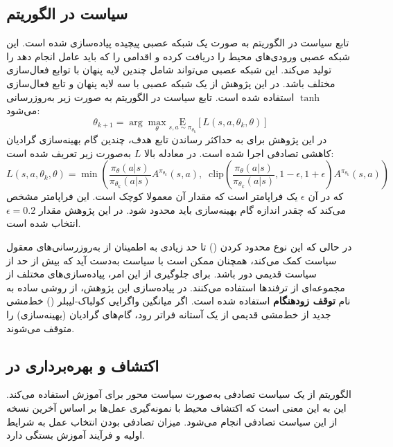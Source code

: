\subsection{
    سیاست در الگوریتم 
}
تابع سیاست در الگوریتم  به صورت یک شبکه عصبی پیچیده پیاده‌سازی شده است. این شبکه عصبی ورودی‌های محیط را دریافت کرده و اقدامی را که باید عامل انجام دهد را تولید می‌کند. این شبکه عصبی می‌تواند شامل چندین لایه پنهان با توابع فعال‌سازی مختلف باشد. در این پژوهش از یک شبکه عصبی با سه لایه پنهان و تابع فعال‌سازی 
\(\tanh\)
استفاده شده است.
تابع سیاست در الگوریتم  به صورت زیر به‌روز‌رسانی می‌شود:
\begin{equation}
    \theta_{k+1} = \arg \max_{\theta} \underset{s,a \sim \pi_{\theta_k}}{{\mathrm E}}\left[
        L(s,a,\theta_k, \theta)\right]
\end{equation}
در این پژوهش برای به حداکثر رساندن تابع هدف، چندین گام بهینه‌سازی 
گرادیان کاهشی تصادفی
اجرا شده است.
در معادله بالا
\(L\)
به‌صورت زیر تعریف شده است:
\begin{equation}
    L(s,a,\theta_k,\theta) = \min\left(
    \frac{\pi_{\theta}(a|s)}{\pi_{\theta_k}(a|s)}  A^{\pi_{\theta_k}}(s,a), \;\;
    \text{clip}\left(\frac{\pi_{\theta}(a|s)}{\pi_{\theta_k}(a|s)}, 1 - \epsilon, 1+\epsilon \right) A^{\pi_{\theta_k}}(s,a)
    \right)
\end{equation}
که در آن
\(\epsilon\)
یک فراپامتر است که مقدار آن معمولا کوچک است.
این فراپامتر مشخص می‌کند که چقدر اندازه گام بهینه‌سازی باید محدود شود.
در این پژوهش مقدار 
\(\epsilon = 0.2\)
انتخاب شده است.


در حالی که این نوع محدود کردن 
()
 تا حد زیادی به اطمینان از به‌روزرسانی‌های معقول سیاست کمک می‌کند، همچنان ممکن است با سیاست به‌دست آید که بیش از حد از سیاست قدیمی دور باشد. برای جلوگیری از این امر، پیاده‌سازی‌های مختلف  از مجموعه‌ای از ترفندها استفاده می‌کنند. در پیاده‌سازی این پژوهش، از روشی ساده به نام
  \textbf{توقف زودهنگام}
   استفاده شده است. اگر میانگین واگرایی کولباک-لیبلر () خط‌مشی جدید از خط‌مشی قدیمی از یک آستانه فراتر رود، گام‌های گرادیان (بهینه‌سازی) را متوقف می‌شوند. 
   
   
        \subsection{اکتشاف و بهره‌برداری در 
   }
الگوریتم  از یک سیاست تصادفی به‌صورت سیاست محور برای آموزش استفاده می‌کند. این به این معنی است که اکتشاف محیط با نمونه‌گیری عمل‌ها بر اساس آخرین نسخه از این سیاست تصادفی انجام می‌شود. میزان تصادفی بودن انتخاب عمل به شرایط اولیه و فرآیند آموزش بستگی دارد.

